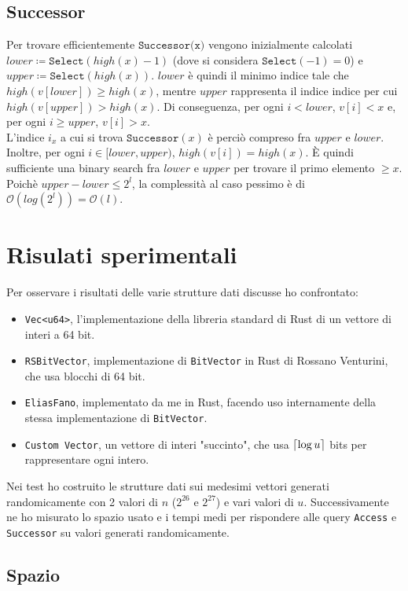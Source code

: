 \documentclass{article}
\DeclarePairedDelimiter\ceil{\lceil}{\rceil}
\newcommand{\ttt}{\texttt}
\newcommand*{\OO}{\ensuremath{\mathcal{O}}}
\newcommand{\clg}[1]{\ensuremath \ceil{\log #1}}
\begin{document}
\subsection{Successor}
Per trovare efficientemente $\ttt{Successor(x)}$ vengono inizialmente calcolati $lower \coloneq \ttt{Select}(high(x) - 1)$ (dove si considera $\ttt{Select}(-1) = 0$) e $upper \coloneq \ttt{Select}(high(x))$.
$lower$ \`e quindi il minimo indice tale che $high(v[lower]) \ge high(x)$, mentre $upper$ rappresenta il indice indice per cui $high(v[upper]) > high(x)$. Di conseguenza, per ogni $i < lower$, $v[i] < x$ e, per ogni $i \ge upper$, $v[i] > x$.\\
L'indice $i_x$ a cui si trova $\ttt{Successor}(x)$ \`e perci\`o compreso fra $upper$ e $lower$. Inoltre, per ogni $i \in [lower, upper)$, $high(v[i]) = high(x)$.
\`E quindi sufficiente una binary search fra $lower$ e $upper$ per trovare il primo elemento $\ge x$.\\
Poich\`e $upper - lower \le 2^l$, la complessit\`a al caso pessimo \`e di $\OO(log (2^l)) = \OO(l)$.

\section{Risulati sperimentali}

Per osservare i risultati delle varie strutture dati discusse ho confrontato:
\begin{itemize}
    \item \ttt{Vec<u64>}, l'implementazione della libreria standard di Rust di un vettore di interi a 64 bit.
    \item \ttt{RSBitVector}, implementazione di \ttt{BitVector} in Rust  di Rossano Venturini, che usa blocchi di 64 bit.
    \item \ttt{EliasFano}, implementato da me in Rust, facendo uso internamente della stessa implementazione di \ttt{BitVector}.
    \item \ttt{Custom Vector}, un vettore di interi "succinto", che usa $\clg{u}$ bits per rappresentare ogni intero.
\end{itemize}

Nei test ho costruito le strutture dati sui medesimi vettori generati randomicamente con 2 valori di $n$ ($2^{26}$ e $2^{27}$) e vari valori di $u$. Successivamente ne ho misurato lo spazio usato e i tempi medi per rispondere alle query \ttt{Access} e \ttt{Successor} su valori generati randomicamente.

\subsection{Spazio}
\end{document}
